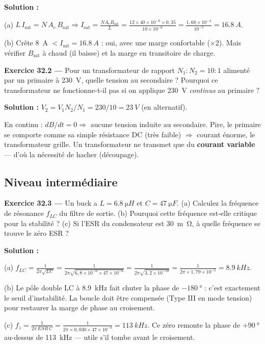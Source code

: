 \documentclass[12pt,a4paper,twoside]{book}
\begin{document}
\begin{pratique}
\textbf{Solution :}

(a) $L\,I_{\text{sat}} = N\,A_e\,B_{\text{sat}} \Rightarrow I_{\text{sat}} = \frac{N A_e B_{\text{sat}}}{L} = \frac{12\times40\times10^{-6}\times0{,}35}{10\times10^{-6}} = \frac{1{,}68\times10^{-4}}{10^{-5}} = \SI{16.8}{A}$.

(b) Crête \SI{8}{A} $< I_{\text{sat}} = \SI{16.8}{A}$ : oui, avec une marge confortable ($\times 2$). Mais vérifier $B_{\text{sat}}$ à chaud (il baisse) et la marge en transitoire de charge.
\end{pratique}

\textbf{Exercice 32.2 ---} Pour un transformateur de rapport $N_1:N_2 = 10:1$ alimenté par un primaire à \SI{230}{V}, quelle tension au secondaire ? Pourquoi ce transformateur ne fonctionne-t-il pas si on applique \SI{230}{V} \textit{continus} au primaire ?

\begin{pratique}
\textbf{Solution :} $V_2 = V_1 N_2/N_1 = 230/10 = \SI{23}{V}$ (en alternatif).

En continu : $dB/dt = 0 \Rightarrow$ aucune tension induite au secondaire. Pire, le primaire se comporte comme sa simple résistance DC (très faible) $\Rightarrow$ courant énorme, le transformateur grille. Un transformateur ne transmet que du \textbf{courant variable} --- d'où la nécessité de hacher (découpage).
\end{pratique}

\subsection*{Niveau intermédiaire}

\textbf{Exercice 32.3 ---} Un buck a $L = \SI{6.8}{\micro H}$ et $C = \SI{47}{\micro F}$. (a) Calculez la fréquence de résonance $f_{LC}$ du filtre de sortie. (b) Pourquoi cette fréquence est-elle critique pour la stabilité ? (c) Si l'ESR du condensateur est \SI{30}{m\ohm}, à quelle fréquence se trouve le zéro ESR ?

\begin{pratique}
\textbf{Solution :}

(a) $f_{LC} = \frac{1}{2\pi\sqrt{LC}} = \frac{1}{2\pi\sqrt{6{,}8\times10^{-6}\times47\times10^{-6}}} = \frac{1}{2\pi\sqrt{3{,}2\times10^{-10}}} = \frac{1}{2\pi\times1{,}79\times10^{-5}} = \SI{8.9}{kHz}$.

(b) Le pôle double LC à \SI{8.9}{kHz} fait chuter la phase de $-\SI{180}{°}$ : c'est exactement le seuil d'instabilité. La boucle doit être compensée (Type III en mode tension) pour restaurer la marge de phase au croisement.

(c) $f_z = \frac{1}{2\pi\,ESR\,C} = \frac{1}{2\pi\times0{,}030\times47\times10^{-6}} = \SI{113}{kHz}$. Ce zéro remonte la phase de $+\SI{90}{°}$ au-dessus de \SI{113}{kHz} --- utile s'il tombe avant le croisement.
\end{pratique}
\end{document}
